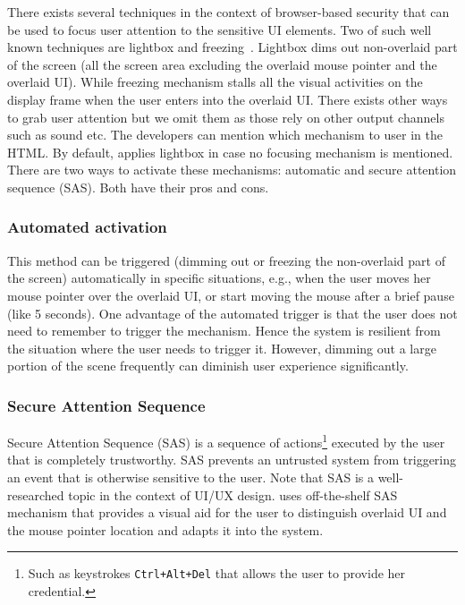  There exists several techniques in the context of browser-based security that can be used to focus user attention to the sensitive UI elements. Two of such well known techniques are lightbox and freezing~\cite{huang2012clickjacking}. Lightbox dims out non-overlaid part of the screen (all the screen area excluding the overlaid mouse pointer and the overlaid UI). While freezing mechanism stalls all the visual activities on the display frame when the user enters into the overlaid UI. There exists other ways to grab user attention but we omit them as those rely on other output channels such as sound etc. The developers can mention which mechanism to user in the HTML. By default, \name applies lightbox in case no focusing mechanism is mentioned. There are two ways to activate these mechanisms: automatic and secure attention sequence (SAS). Both have their pros and cons.


\subsubsection{\bfseries Automated activation}
\label{sec:systemDesign:userAttention:automated}

This method can be triggered (dimming out or freezing the non-overlaid part of the screen) automatically in specific situations, e.g., when the user moves her mouse pointer over the overlaid UI, or start moving the mouse after a brief pause (like 5 seconds). One advantage of the automated trigger is that the user does not need to remember to trigger the mechanism. Hence the system is resilient from the situation where the user needs to trigger it. However, dimming out a large portion of the scene frequently can diminish user experience significantly.   

\subsubsection{\bfseries Secure Attention Sequence}
\label{sec:systemDesign:userAttention:sas}

Secure Attention Sequence (SAS) is a sequence of actions\footnote{Such as keystrokes \texttt{Ctrl+Alt+Del} that allows the user to provide her credential.} executed by the user that is completely trustworthy. SAS prevents an untrusted system from triggering an event that is otherwise sensitive to the user. Note that SAS is a well-researched topic in the context of UI/UX design. \name uses off-the-shelf SAS mechanism that provides a visual aid for the user to distinguish overlaid UI and the mouse pointer location and adapts it into the system. 

